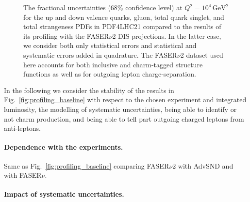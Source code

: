 \begin{figure}[t]
\caption{
The fractional uncertainties   (68\% confidence level) at $Q^2 = 10^4 \, \textrm{GeV}^2$ 
for the up and down valence quarks, gluon, total quark singlet, and total strangeness PDFs
in PDF4LHC21 compared to the results of its profiling with the FASER$\nu$2
DIS projections.
%
In the latter case, we consider both only statistical errors and statistical and systematic
errors added in quadrature.
%
The FASER$\nu$2 dataset used here accounts for both  inclusive and charm-tagged structure functions
as well as for outgoing lepton charge-separation.
%
}
\label{fig:profiling_syst}
\end{figure}


In the following we consider the stability of the results in Fig.~\ref{fig:profiling_baseline}
with respect to the chosen experiment and integrated luminosity, the modelling of systematic
uncertainties, being able to identify or not charm production, and being able to tell part outgoing
charged leptons from anti-leptons.

\paragraph{Dependence with the experiments.}
%
Same as Fig.~\ref{fig:profiling_baseline} comparing FASER$\nu$2 with AdvSND and with FASER$\nu$.

\paragraph{Impact of systematic uncertainties.}


